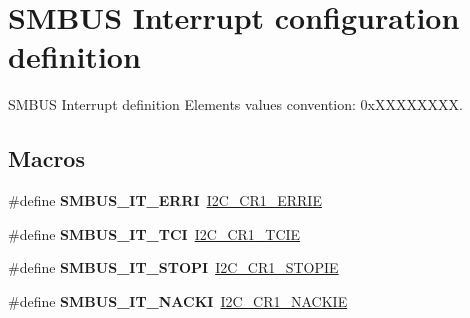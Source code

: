 \hypertarget{group___s_m_b_u_s___interrupt__configuration__definition}{}\section{S\+M\+B\+US Interrupt configuration definition}
\label{group___s_m_b_u_s___interrupt__configuration__definition}


S\+M\+B\+US Interrupt definition Elements values convention\+: 0x\+X\+X\+X\+X\+X\+X\+XX.  


\subsection*{Macros}
\begin{DoxyCompactItemize}
\item 
\mbox{\label{group___s_m_b_u_s___interrupt__configuration__definition_gaa07be457cbdae173ebb60bc191c13358}} 
\#define {\bfseries S\+M\+B\+U\+S\+\_\+\+I\+T\+\_\+\+E\+R\+RI}~\hyperlink{group___peripheral___registers___bits___definition_ga75e971012a02f9dad47a1629c6f5d956}{I2\+C\+\_\+\+C\+R1\+\_\+\+E\+R\+R\+IE}
\item 
\mbox{\label{group___s_m_b_u_s___interrupt__configuration__definition_ga7c4e11797e0216385fa8792ad57b8a33}} 
\#define {\bfseries S\+M\+B\+U\+S\+\_\+\+I\+T\+\_\+\+T\+CI}~\hyperlink{group___peripheral___registers___bits___definition_ga6b37e64bdf6399ef12c3df77bcb1634f}{I2\+C\+\_\+\+C\+R1\+\_\+\+T\+C\+IE}
\item 
\mbox{\label{group___s_m_b_u_s___interrupt__configuration__definition_ga2fb6769052b4ac3bd99d419049cbfc1f}} 
\#define {\bfseries S\+M\+B\+U\+S\+\_\+\+I\+T\+\_\+\+S\+T\+O\+PI}~\hyperlink{group___peripheral___registers___bits___definition_ga1f1576cb1a2cd847f55fe2a0820bb166}{I2\+C\+\_\+\+C\+R1\+\_\+\+S\+T\+O\+P\+IE}
\item 
\mbox{\label{group___s_m_b_u_s___interrupt__configuration__definition_gacc8688c81151675a539c0b6a5baa78f6}} 
\#define {\bfseries S\+M\+B\+U\+S\+\_\+\+I\+T\+\_\+\+N\+A\+C\+KI}~\hyperlink{group___peripheral___registers___bits___definition_gae3f71f7a55e13a467b2a5ed639e0fe18}{I2\+C\+\_\+\+C\+R1\+\_\+\+N\+A\+C\+K\+IE}

\end{DoxyCompactItemize}

